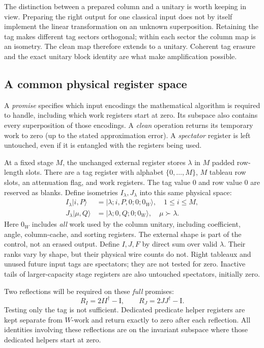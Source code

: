 \documentclass[11pt]{article}
\theoremstyle{definition}
\newcommand{\ket}[1]{\lvert #1\rangle}
\newcommand{\Id}{\mathrm I}
\begin{document}
The distinction between a prepared column and a unitary is worth keeping
in view. Preparing the right output for one classical input does not by
itself implement the linear transformation on an unknown superposition.
Retaining the tag makes different tag sectors orthogonal; within each
sector the column map is an isometry. The clean map therefore extends to
a unitary. Coherent tag erasure and the exact unitary block identity are
what make amplification possible.

\subsection{A common physical register space}

A \emph{promise} specifies which input encodings the mathematical
algorithm is required to handle, including which work registers start
at zero. Its subspace also contains every superposition of those
encodings. A \emph{clean} operation returns its temporary work to zero
(up to the stated approximation error). A \emph{spectator} register is
left untouched, even if it is entangled with the registers being used.

At a fixed stage $M$, the unchanged external register stores $\lambda$ in
$M$ padded row-length slots. There are a tag register with alphabet
$\{0,\ldots,M\}$, $M$ tableau row slots, an attenuation flag, and work
registers. The tag value $0$ and row value $0$ are reserved as blanks.
Define isometries $I_\lambda,J_\lambda$ into this same physical space:
\begin{align*}
 I_\lambda\ket{i,P}&=\ket{\lambda;i,P,0;0;0_{W}},\quad 1\le i\le M,\\
 J_\lambda\ket{\mu,Q}&=\ket{\lambda;0,Q;0;0_{W}},\quad\mu\succ\lambda.
\end{align*}
Here $0_W$ includes \emph{all} work used by the column unitary, including
coefficient, angle, column-cache, and sorting registers. The external shape
is part of the control, not an erased output. Define $I,J,F$ by direct sum
over valid $\lambda$. Their ranks vary by shape, but their physical wire
counts do not. Right tableaux and unused future input tags are spectators;
they are not tested for zero. Inactive tails of larger-capacity stage
registers are also untouched spectators, initially zero.

Two reflections will be required on these \emph{full} promises:
\begin{equation}\label{eq:reflect}
 R_I=2II^\dagger-\Id,\qquad R_J=2JJ^\dagger-\Id.
\end{equation}
Testing only the tag is not sufficient. Dedicated predicate helper registers
are kept separate from $W$-work and return exactly to zero after each
reflection. All identities involving these reflections are on the invariant
subspace where those dedicated helpers start at zero.
\end{document}
